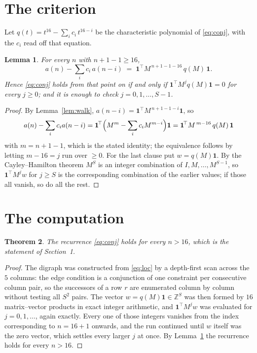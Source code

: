 \documentclass[11pt,a4paper]{article}
\theoremstyle{plain}
\newtheorem{theorem}{Theorem}
\newtheorem{lemma}[theorem]{Lemma}
\theoremstyle{definition}
\begin{document}
\section{The criterion}

Let $q(t)=t^{16}-\sum_i c_i\,t^{16-i}$ be the characteristic polynomial of
\eqref{eq:conj}, with the $c_i$ read off that equation.

\begin{lemma}\label{lem:crit}
For every $n$ with $n+1-1\ge16$,
\[
a(n)-\sum_i c_i\,a(n-i)\;=\;\mathbf{1}^{\!\top}M^{\,n+1-1-16}\,q(M)\,\mathbf{1} .
\]
Hence \eqref{eq:conj} holds from that point on if and only if
$\mathbf{1}^{\!\top}M^{j}q(M)\mathbf{1}=0$ for every $j\ge0$; and it is enough to check
$j=0,1,\dots,S-1$.
\end{lemma}

\begin{proof}
By Lemma~\ref{lem:walk}, $a(n-i)=\mathbf{1}^{\!\top}M^{\,n+1-1-i}\mathbf{1}$, so
\[
a(n)-\sum_i c_i a(n-i)
=\mathbf{1}^{\!\top}\Bigl(M^{m}-\sum_i c_i M^{m-i}\Bigr)\mathbf{1}
=\mathbf{1}^{\!\top}M^{\,m-16}\,q(M)\,\mathbf{1}
\]
with $m=n+1-1$, which is the stated identity; the equivalence follows by letting
$m-16=j$ run over $\ge0$. For the last clause put $w=q(M)\mathbf{1}$. By the
Cayley--Hamilton theorem $M^{S}$ is an integer combination of $I,M,\dots,M^{S-1}$, so
$\mathbf{1}^{\!\top}M^{j}w$ for $j\ge S$ is the corresponding combination of the earlier
values; if those all vanish, so do all the rest.
\end{proof}

\section{The computation}

\begin{theorem}
The recurrence \eqref{eq:conj} holds for every $n>16$, which is the statement of
Section~1.
\end{theorem}

\begin{proof}
The digraph was constructed from \eqref{eq:loc} by a depth-first scan across the $5$
columns: the edge condition is a conjunction of one constraint per consecutive column
pair, so the successors of a row $r$ are enumerated column by column without testing all
$S^2$ pairs. The vector $w=q(M)\mathbf{1}\in\mathbb{Z}^{S}$ was then formed by $16$
matrix--vector products in exact integer arithmetic, and $\mathbf{1}^{\!\top}M^{j}w$ was
evaluated for $j=0,1,\dots$, again exactly. Every one of those integers vanishes from the
index corresponding to $n=16+1$ onwards, and the run continued until $w$ itself was the
zero vector, which settles every larger $j$ at once. By Lemma~\ref{lem:crit} the recurrence
holds for every $n>16$.
\end{proof}
\end{document}
